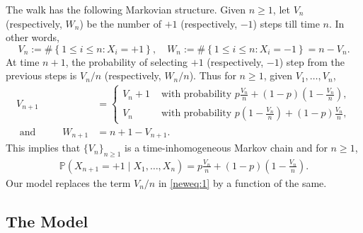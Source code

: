 \documentclass[12pt]{amsart}
\theoremstyle{plain}
\theoremstyle{remark}
\numberwithin{equation}{section}
\begin{document}
The walk has the following Markovian structure. Given $n \geq 1$, let $V_n$ (respectively, $W_n$) be the number of $+1$ (respectively, $-1$) steps till time $n$. In other words, \[{V_n} := \#\left\{1 \leq i \leq n : X_i = +1\right\}, \quad {W_n} := \#\left\{1 \leq i \leq n : X_i = -1\right\} = n - V_n.\] At time $n+1$, the probability of selecting $+1$ (respectively, $-1$) step from the previous steps is $V_n/n$ (respectively, $W_n/n$). Thus for $n \geq 1$, given $V_1, \ldots, V_n$,
\begin{align}\label{eq4}
           V_{n+1} &= \begin{cases}
              V_n+1 &\text{ with probability } p{\frac{V_n}{n}} + (1-p)\left(1-{\frac{V_n}{n}}\right),\\ 
              V_n &\text{ with probability } p{\left(1-{\frac{V_n}{n}}\right)} + (1-p){\frac{V_n}{n}},
           \end{cases}\\ \text{ and } \hspace{1cm} W_{n+1} &= n+1 - V_{n+1}. \nonumber
\end{align}
This implies that $\{V_n\}_{n\geq1}$ is a time-inhomogeneous Markov chain 
and for $n \geq 1$, \begin{align}\label{neweq:1}\mathbb{P}\left(X_{n+1} = +1 \mid X_1, \ldots, X_n\right) = p{\frac{V_n}{n}} + (1-p)\left(1-{\frac{V_n}{n}}\right).\end{align} Our model replaces the term ${V_n}/{n}$ in \eqref{neweq:1} by a function of the same.

\subsection{The Model}\label{subsec:model-ldrw}
\end{document}
